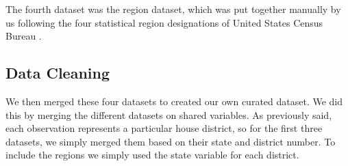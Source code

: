 \documentclass[12pt]{article}
\newcommand{\blue}[1]{\textcolor{blue}{#1}}
\begin{document}


The fourth dataset was the region dataset, which was put together manually by us following the four statistical region designations of United States Census Bureau \parencite{regions}. 


\subsection*{Data Cleaning}

We then merged these four datasets to created our own curated dataset. We did this by merging the different datasets on shared variables. As previously said, each observation represents a particular house district, so for the first three datasets, we simply merged them based on their state and district number. To include the regions we simply used the state variable for each district. 
\end{document}
